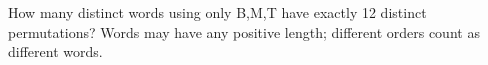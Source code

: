 How many distinct words using only B,M,T have exactly 12 distinct permutations? Words may have any positive length; different orders count as different words.
